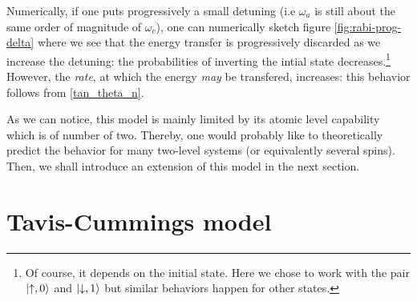 \documentclass[10pt]{report}
\DeclarePairedDelimiter\ket{\lvert}{\rangle}
\begin{document}
Numerically, if one puts progressively a small detuning (i.e $\omega_a$ is still about the same order of magnitude of $\omega_c$), one can numerically sketch figure \ref{fig:rabi-prog-delta} where we see that the energy transfer is progressively discarded as we increase the detuning: the probabilities of inverting the intial state decreases.\footnote{Of course, it depends on the initial state. Here we chose to work with the pair $\ket{\uparrow, 0}$ and $\ket{\downarrow, 1}$ but similar behaviors happen for other states.} However, the \textit{rate}, at which the energy \textit{may} be transfered, increases: this behavior follows from \eqref{tan_theta_n}.

As we can notice, this model is mainly limited by its atomic level capability which is of number of two. Thereby, one would probably like to theoretically predict the behavior for many two-level systems (or equivalently several spins). Then, we shall introduce an extension of this model in the next section.

\section{Tavis-Cummings model}
\paragraph{}
\end{document}
